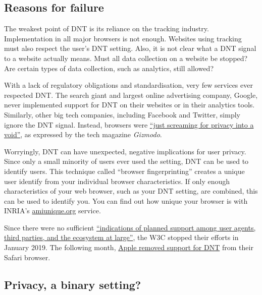 \documentclass[
]{book}
\begin{document}
\hypertarget{reasons-for-failure}{%
\subsection{Reasons for failure}\label{reasons-for-failure}}

The weakest point of DNT is its reliance on the tracking industry. Implementation in all major browsers is not enough. Websites using tracking must also respect the user's DNT setting. Also, it is not clear what a DNT signal to a website actually means. Must all data collection on a website be stopped? Are certain types of data collection, such as analytics, still allowed?

With a lack of regulatory obligations and standardisation, very few services ever respected DNT. The search giant and largest online advertising company, Google, never implemented support for DNT on their websites or in their analytics tools. Similarly, other big tech companies, including Facebook and Twitter, simply ignore the DNT signal. Instead, browsers were \href{https://gizmodo.com/do-not-track-the-privacy-tool-used-by-millions-of-peop-1828868324}{``just screaming for privacy into a void''}, as expressed by the tech magazine \emph{Gizmodo}.

Worryingly, DNT can have unexpected, negative implications for user privacy. Since only a small minority of users ever used the setting, DNT can be used to identify users. This technique called ``browser fingerprinting'' creates a unique user identify from your individual browser characteristics. If only enough characteristics of your web browser, such as your DNT setting, are combined, this can be used to identify you. You can find out how unique your browser is with INRIA's \href{https://amiunique.org/}{amiunique.org} service.

Since there were no sufficient \href{https://github.com/w3c/dnt/commit/5d85d6c3d116b5eb29fddc69352a77d87dfd2310}{``indications of planned support among user agents, third parties, and the ecosystem at large''}, the W3C stopped their efforts in January 2019. The following month, \href{https://www.fastcompany.com/90308068/how-the-tragic-death-of-do-not-track-ruined-the-web-for-everyone}{Apple removed support for DNT} from their Safari browser.

\hypertarget{privacy-a-binary-setting}{%
\subsection{Privacy, a binary setting?}\label{privacy-a-binary-setting}}
\end{document}
